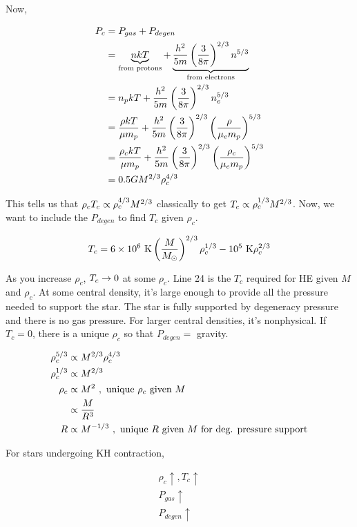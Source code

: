Now,

\begin{align}
P_c &= P_{gas} + P_{degen}\\
&= \underbrace{nkT}_{\text{from protons}} + \underbrace{\frac{h^2}{5m} \left( \frac{3}{8 \pi} \right)^{2/3} n^{5/3}}_{\text{from electrons}}\\
&= n_p kT + \frac{h^2}{5m} \left( \frac{3}{8 \pi} \right)^{2/3} n_e^{5/3}\\
&= \frac{\rho kT}{\mu m_p} + \frac{h^2}{5m} \left( \frac{3}{8 \pi} \right)^{2/3} \left(  \frac{\rho}{\mu_e m_p}\right)^{5/3}\\
&= \frac{\rho_c kT}{\mu m_p} + \frac{h^2}{5m} \left( \frac{3}{8 \pi} \right)^{2/3} \left(  \frac{\rho_c}{\mu_e m_p}\right)^{5/3}\\
&= 0.5 GM^{2/3} \rho_c^{4/3}
\end{align}

This tells us that $\rho_c T_c \propto \rho_c ^{4/3}M^{2/3}$ classically to get $T_c \propto \rho_c^{1/3}M^{2/3}$. Now, we want to include the $P_{degen}$ to find $T_c$ given $\rho_c$. 

\begin{align}
T_c = 6 \times 10^6 \text{ K} \left( \frac{M}{M_\odot}\right)^{2/3}\rho_c^{1/3} - 10^5 \text{ K} \rho_c^{2/3}
\end{align}

As you increase $\rho_c$, $T_c \rightarrow 0$ at some $\rho_c$. Line 24 is the $T_c$ required for HE given $M$ and $\rho_c$. At some central density, it's large enough to provide all the pressure needed to support the star. The star is fully supported by degeneracy pressure and there is no gas pressure. For larger central densities, it's nonphysical. If $T_c = 0$, there is a unique $\rho_c$ so that $P_{degen} =$ gravity. 

\begin{align}
\rho_c^{5/3} &\propto M^{2/3} \rho_c^{4/3}\\
\rho_c^{1/3} &\propto M^{2/3}\\
\rho_c &\propto M^2~,\text{ unique $\rho_c$ given $M$}\\
&\propto \frac{M}{R^3}\\
R &\propto M^{-1/3}~,\text{ unique $R$ given $M$ for deg. pressure support}
\end{align}

For stars undergoing KH contraction,

\begin{align}
\rho_c \uparrow, T_c \uparrow\\
P_{gas} \uparrow\\
P_{degen} \uparrow
\end{align}

